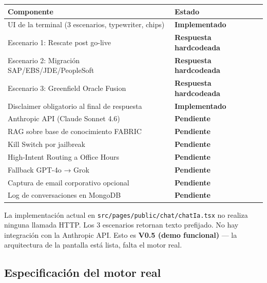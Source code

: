 \documentclass[11pt, a4paper]{article}
\newcommand{\ruta}[1]{\texttt{\color{accent2}#1}}
\begin{document}
\begin{table}[h]
\centering
\begin{tabularx}{\linewidth}{X >{\small\bfseries}l}
\toprule
Componente & Estado \\
\midrule
UI de la terminal (3 escenarios, typewriter, chips) & \color{accent}Implementado \\
Escenario 1: Rescate post go-live & \color{accent2}Respuesta hardcodeada \\
Escenario 2: Migración SAP/EBS/JDE/PeopleSoft & \color{accent2}Respuesta hardcodeada \\
Escenario 3: Greenfield Oracle Fusion & \color{accent2}Respuesta hardcodeada \\
Disclaimer obligatorio al final de respuesta & \color{accent}Implementado \\
Anthropic API (Claude Sonnet 4.6) & \color{danger}Pendiente \\
RAG sobre base de conocimiento FABRIC & \color{danger}Pendiente \\
Kill Switch por jailbreak & \color{danger}Pendiente \\
High-Intent Routing a Office Hours & \color{danger}Pendiente \\
Fallback GPT-4o → Grok & \color{danger}Pendiente \\
Captura de email corporativo opcional & \color{danger}Pendiente \\
Log de conversaciones en MongoDB & \color{danger}Pendiente \\
\bottomrule
\end{tabularx}
\end{table}

\begin{pendiente}
La implementación actual en \ruta{src/pages/public/chat/chatIa.tsx}
no realiza ninguna llamada HTTP. Los 3 escenarios retornan texto prefijado.
No hay integración con la Anthropic API. Esto es \textbf{V0.5 (demo funcional)}
— la arquitectura de la pantalla está lista, falta el motor real.
\end{pendiente}

\subsection{Especificación del motor real}
\end{document}
